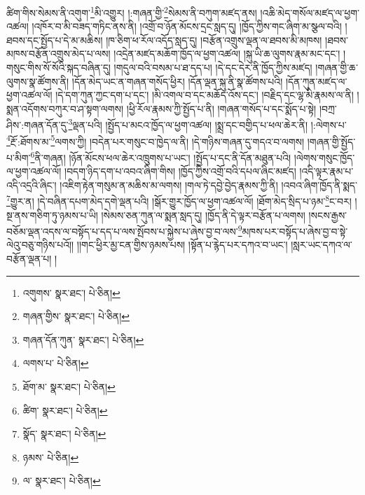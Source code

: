 ཚིག་གིས་སེམས་ནི་འགུག་\footnote{འགུགས་  སྣར་ཐང་།  པེ་ཅིན། }མི་འགྱུར། །:གཞན་གྱི་\footnote{གཞན་གྱིས་  སྣར་ཐང་།  པེ་ཅིན། }སེམས་ནི་བཀུག་མཛད་ནས། །འཆི་མེད་གསོལ་མཛད་ལ་ཕྱག་འཚལ། །འཁོར་བ་མི་བཟད་གཏིང་ནས་ནི། །འགྲོ་བ་ཉོན་མོངས་དྲང་སླད་དུ། །ཁྱོད་ཀྱིས་གང་ཞིག་མ་སྩལ་བའི། །ཐབས་དང་སྤྱོད་པ་དེ་མ་མཆིས། །ཁ་ཅིག་ཕ་རོལ་འདོད་སླད་དུ། །བརྩོན་འགྲུས་ལྡན་ལ་ཐབས་མི་མཁས། །ཐབས་མཁས་བརྩོན་འགྲུས་མེད་པ་ལས། །འདྲེན་མཛད་མཆོག་ཁྱོད་ལ་ཕྱག་འཚལ། །སྐུ་ཡི་ཆ་ལུགས་རྣམ་མང་དང་། །གསུང་གིས་སོ་སོའི་སྐད་བཞིན་དུ། །གདུལ་བའི་བསམ་པ་ཐ་དད་པ། །དེ་དང་དེར་ནི་ཁྱོད་ཀྱིས་མཛད། །གཞན་གྱི་ཆ་ལུགས་སྣ་ཚོགས་ནི། །དོན་མེད་ཡང་ན་གཞན་གསོད་ཕྱིར། །དོན་ལྡན་སྐུ་ནི་སྣ་ཚོགས་པའི། །དོན་ཀུན་མཛད་ལ་ཕྱག་འཚལ་ལོ། །དེ་དག་ཀུན་ཀྱང་དག་པ་དང་། །མི་འགལ་བ་དང་མཆོད་འོས་དང་། །བརྗིད་དང་ལྷ་མི་རྣམས་ལ་ནི། །སྨན་འདོགས་བཀུར་བ་ཤ་སྟག་ལགས། །ཕྱི་རོལ་རྣམས་ཀྱི་སྤྱོད་པ་ནི། །གཞན་གསོད་པ་དང་སྨོད་པ་སྟེ། །བཀྲ་ཤིས་:གཞན་དོན་དུ་\footnote{གཞན་དོན་ཀུན་  སྣར་ཐང་།  པེ་ཅིན། }ལྡན་པའི། །སྤྱོད་པ་མངའ་ཁྱོད་ལ་ཕྱག་འཚལ། །སྨྲ་དང་བགྱིད་པ་ཕལ་ཆེར་ནི། །:ལེགས་པ་\footnote{ལགས་པ་  པེ་ཅིན། }རྔོ་:ཐོགས་མ་\footnote{ཐོག་མ་  སྣར་ཐང་།  པེ་ཅིན། }ལགས་ཀྱི། །བདེན་པར་གསུང་བ་ཁྱེད་ལ་ནི། །དེ་གཉིས་གཞན་དུ་གདའ་བ་ལགས། །གཞན་གྱི་སྤྱོད་པ་མིག་\footnote{ཚིག་  སྣར་ཐང་།  པེ་ཅིན། }ནི་གཞན། །ཉོན་མོངས་ཕལ་ཆེར་འཁྲུགས་པ་ཡང་། །སྤྱོད་པ་དང་ནི་དོན་མཐུན་པའི། །ལེགས་གསུང་ཁྱོད་ལ་ཕྱག་འཚལ་ལོ། །བདག་ཉིད་དག་པ་འབའ་ཞིག་གིས། །ཁྱོད་ཀྱིས་འགྲོ་བའི་དཔལ་ཞིང་མཛད། །འདི་ལྟར་རྣམ་པ་འདི་འདྲའི་ཞིང་། །འཇིག་རྟེན་གསུམ་ན་མཆིས་མ་ལགས། །གལ་ཏེ་དབྱེ་བྱེད་རྣམས་ཀྱི་ནི། །འབའ་ཞིག་ཁྱོད་ནི་སྨད་\footnote{སྣོད་  སྣར་ཐང་།  པེ་ཅིན། }གྱུར་ན། །དེ་བཞིན་དཔག་མེད་དགེ་ལྡན་པའི། །སྒོར་གྱུར་ཁྱོད་ལ་ཕྱག་འཚལ་ལོ། །ཐོག་མེད་སྲིད་པ་ཉམ་\footnote{ཉམས་  པེ་ཅིན། }ང་བར། །སྔ་ནས་གཅིག་ཏུ་ཉམས་པ་ཡི། །སེམས་ཅན་ཀུན་ལ་སྨན་སླད་དུ། །ཁྱོད་ནི་དེ་ལྟར་བརྩོན་པ་ལགས། །སངས་རྒྱས་བཅོམ་ལྡན་འདས་ལ་བསྟོད་པ་དད་པ་ལས་སྤོབས་པ་སྐྱེས་པ་ཞེས་བྱ་བ་ལས་\footnote{ལ་  སྣར་ཐང་།  པེ་ཅིན། }མཁས་པར་བསྟོད་པ་ཞེས་བྱ་བ་སྟེ་ལེའུ་བཅུ་གཉིས་པའོ།། །།གང་ཕྱིར་མྱ་ངན་གྱིས་ཉམས་པས། །སྟོན་པ་རྙེད་པར་དཀའ་བ་ཡང་། །སླར་ཡང་དཀའ་ལ་བརྩོན་ལྡན་པ། །

